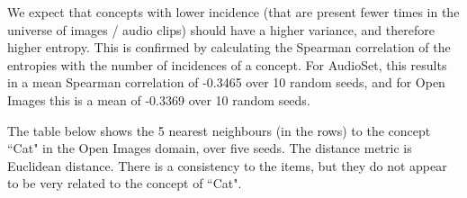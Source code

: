 We expect that concepts with lower incidence (that are present fewer times in the universe of images / audio clips) should have a higher variance, and therefore higher entropy. This is confirmed by calculating the Spearman correlation of the entropies with the number of incidences of a concept. For AudioSet, this results in a mean Spearman correlation of -0.3465 over 10 random seeds, and for Open Images this is a mean of -0.3369 over 10 random seeds. 


%





The table below shows the 5 nearest neighbours (in the rows) to the concept ``Cat" in the Open Images domain, over five seeds. The distance metric is Euclidean distance. There is a consistency to the items, but they do not appear to be very related to the concept of ``Cat".  

